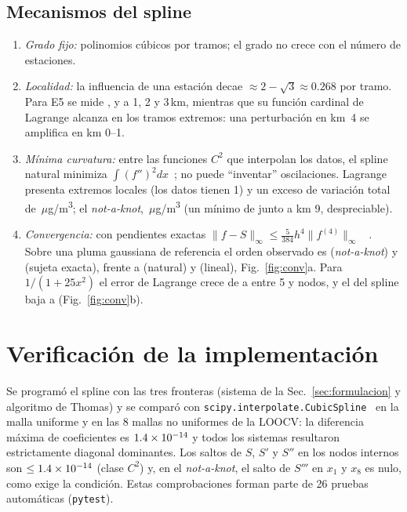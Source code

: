 \documentclass[conference,a4paper]{IEEEtran}
\newcommand{\ugm}{\ensuremath{\mu}g/m\textsuperscript{3}}
\newcommand{\nak}{\emph{not-a-knot}}
\begin{document}
\subsection{Mecanismos del spline}
\begin{enumerate}
\item \emph{Grado fijo:} polinomios cúbicos por tramos; el grado no crece con el número de estaciones.
\item \emph{Localidad:} la influencia de una estación decae $\approx 2-\sqrt3\approx0.268$ por tramo. Para
E5 se mide \LOCuno, \LOCdos{} y \LOCtres{} a 1, 2 y 3\,km, mientras que su función cardinal de Lagrange
alcanza \LOClagBorde{} en los tramos extremos: una perturbación en km~4 se amplifica en km 0--1.
\item \emph{Mínima curvatura:} entre las funciones $C^2$ que interpolan los datos, el spline natural
minimiza $\int (f'')^2dx$~\cite{holladay1957,deboor2001}; no puede ``inventar'' oscilaciones. Lagrange
presenta \EXTlag{} extremos locales (los datos tienen 1) y un exceso de variación total de
\VTlag\,\ugm; el \nak, \VTnak\,\ugm{} (un mínimo de \MINnak{} junto a km 9, despreciable).
\item \emph{Convergencia:} con pendientes exactas $\|f-S\|_\infty\le\frac{5}{384}h^4\|f^{(4)}\|_\infty$
~\cite{hall1976}. Sobre una pluma gaussiana de referencia el orden observado es \ORDnak{} (\nak) y
\ORDsujex{} (sujeta exacta), frente a \ORDnat{} (natural) y \ORDlin{} (lineal), Fig.~\ref{fig:conv}a. Para
$1/(1+25x^2)$ el error de Lagrange crece de \RUNGElagIni{} a \RUNGElagFin{} entre 5 y \RUNGEnodosFin{} nodos,
y el del spline baja a \RUNGEsplFin{} (Fig.~\ref{fig:conv}b).
\end{enumerate}

\section{Verificación de la implementación}
Se programó el spline con las tres fronteras (sistema de la Sec.~\ref{sec:formulacion} y algoritmo de Thomas) y se comparó con
\texttt{scipy.interpolate.CubicSpline}~\cite{virtanen2020} en la malla uniforme y en las 8 mallas no
uniformes de la LOOCV: la diferencia máxima de coeficientes es $1.4\times10^{-14}$ y todos los sistemas resultaron
estrictamente diagonal dominantes. Los saltos de $S$, $S'$ y $S''$ en los nodos internos son
$\le1.4\times10^{-14}$ (clase $C^2$) y, en el \nak, el salto de $S'''$ en $x_1$ y $x_8$ es nulo, como exige la
condición. Estas comprobaciones forman parte de 26 pruebas automáticas (\texttt{pytest}).
\end{document}
